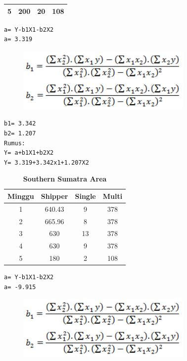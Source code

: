 \begin{enumerate}
\begin{table}[]
\begin{tabular}{|c|c|c|c|}
5      & 200     & 20     & 108   \\ \hline
\end{tabular}
\end{table}
\newpage \begin{lstlisting}
a= Y-b1X1-b2X2      
a= 3.319
\end{lstlisting}
\begin{figure}[!htbp]
\includegraphics[scale=0.6]{chapters/figures/b1b2.JPG}
    \label{Figure4}
\end{figure}
\begin{lstlisting}
b1= 3.342
b2= 1.207
Rumus:
Y= a+b1X1+b2X2
Y= 3.319+3.342x1+1.207X2
\end{lstlisting}
\vspace{6cm}
\begin{table}[]
  \captionsetup{singlelinecheck=off}
  \caption{\textbf{Southern Sumatra Area}}
\begin{tabular}{|c|c|c|c|}
\hline
Minggu & Shipper & Single & Multi \\ \hline
1      & 640.43     & 9     & 378   \\ \hline
2      & 665.96     & 8     & 378   \\ \hline
3      & 630     & 13     & 378   \\ \hline
4      & 630     & 9     & 378   \\ \hline
5      & 180     & 2     & 108   \\ \hline
\end{tabular}
\end{table}
\newpage \begin{lstlisting}
a= Y-b1X1-b2X2      
a= -9.915
\end{lstlisting}
\begin{figure}[!htbp]
\includegraphics[scale=0.6]{chapters/figures/b1b2.JPG}
    \label{Figure4}
\end{figure}

\end{enumerate}
